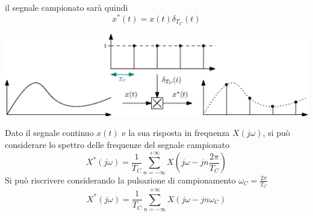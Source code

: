 \documentclass[10pt, letterpaper]{report}
\begin{document}
il segnale campionato sarà quindi 
$$ x^*(t)=x(t)\delta_{T_C}(t)$$
\begin{center}
    \includegraphics[width=\textwidth]{images/trenoImpulsi.eps}
\end{center}
Dato il segnale continuo $x(t)$ e la sua risposta in frequenza $X(j\omega)$, si può considerare lo spettro delle frequenze del segnale campionato 
$$ X^*(j\omega)=\frac{1}{T_C}\sum_{n=-\infty}^{+\infty}X(j\omega-jn\frac{2\pi}{T_C})$$
Si può riscrivere considerando la pulsazione di campionamento $\omega_C=\frac{2\pi}{T_C}$
$$ X^*(j\omega)=\frac{1}{T_C}\sum_{n=-\infty}^{+\infty}X(j\omega-jn\omega_C)$$
\end{document}
